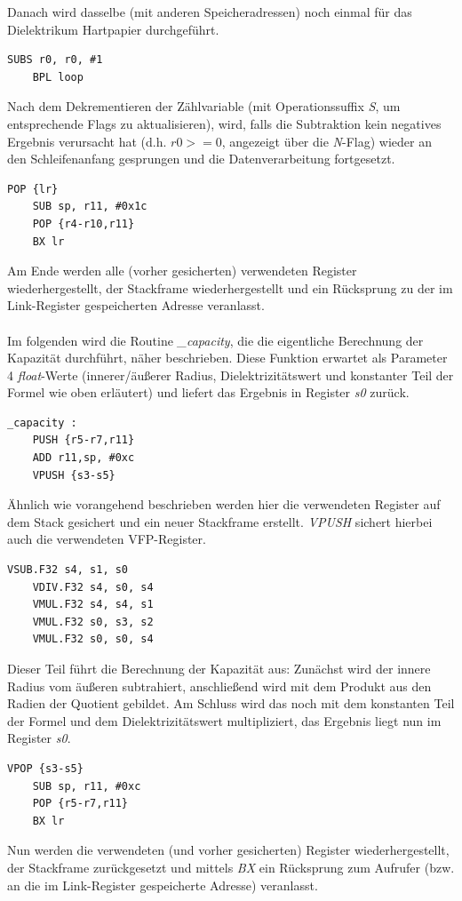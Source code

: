 \documentclass[11pt]{scrartcl}
\begin{document}
Danach wird dasselbe (mit anderen Speicheradressen) noch einmal für das Dielektrikum Hartpapier durchgeführt.
\\
\begin{lstlisting}[language={[x86masm]Assembler}]
	SUBS r0, r0, #1
	BPL loop
\end{lstlisting} 
Nach dem Dekrementieren der Zählvariable (mit Operationssuffix \emph{S}, um entsprechende Flags zu aktualisieren), wird, falls die Subtraktion kein negatives Ergebnis verursacht hat (d.h. $r0 >= 0$, angezeigt über die \emph{N}-Flag) wieder an den Schleifenanfang gesprungen und die Datenverarbeitung fortgesetzt.
\\
\begin{lstlisting}[language={[x86masm]Assembler}]
	POP {lr}
	SUB sp, r11, #0x1c
	POP {r4-r10,r11}
	BX lr
\end{lstlisting}
Am Ende werden alle (vorher gesicherten) verwendeten Register wiederhergestellt, der Stackframe wiederhergestellt und ein Rücksprung zu der im Link-Register gespeicherten Adresse veranlasst.
\\\\
Im folgenden wird die Routine \emph{\_capacity}, die die eigentliche Berechnung der Kapazität durchführt, näher beschrieben. Diese Funktion erwartet als Parameter 4 \emph{float}-Werte (innerer/äußerer Radius, Dielektrizitätswert und konstanter Teil der Formel wie oben erläutert) und liefert das Ergebnis in Register \emph{s0} zurück.
\\
\begin{lstlisting}[language={[x86masm]Assembler}]
_capacity :
	PUSH {r5-r7,r11}
	ADD r11,sp, #0xc
	VPUSH {s3-s5}
\end{lstlisting}
Ähnlich wie vorangehend beschrieben werden hier die verwendeten Register auf dem Stack gesichert und ein neuer Stackframe erstellt. \emph{VPUSH} sichert hierbei auch die verwendeten VFP-Register.
\\
\begin{lstlisting}[language={[x86masm]Assembler}]
	VSUB.F32 s4, s1, s0
	VDIV.F32 s4, s0, s4
	VMUL.F32 s4, s4, s1
	VMUL.F32 s0, s3, s2
	VMUL.F32 s0, s0, s4
\end{lstlisting}
Dieser Teil führt die Berechnung der Kapazität aus: Zunächst wird der innere Radius vom äußeren subtrahiert, anschließend wird mit dem Produkt aus den Radien der Quotient gebildet. Am Schluss wird das noch mit dem konstanten Teil der Formel und dem Dielektrizitätswert multipliziert, das Ergebnis liegt nun im Register \emph{s0}.
\\
\begin{lstlisting}[language={[x86masm]Assembler}]
	VPOP {s3-s5}
	SUB sp, r11, #0xc
	POP {r5-r7,r11}
	BX lr
\end{lstlisting}
Nun werden die verwendeten (und vorher gesicherten) Register wiederhergestellt, der Stackframe zurückgesetzt und mittels \emph{BX} ein Rücksprung zum Aufrufer (bzw. an die im Link-Register gespeicherte Adresse) veranlasst.
\end{document}
